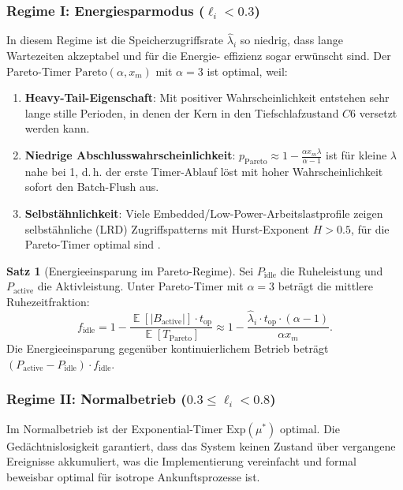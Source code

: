﻿\documentclass[a4paper,12pt]{scrreprt}
\theoremstyle{definition}
\newtheorem{satz}{Satz}[section]
\DeclareMathOperator{\E}{\mathbb{E}}
\newcommand{\Exp}{\mathrm{Exp}}
\newcommand{\Pareto}{\mathrm{Pareto}}
\begin{document}
	\subsubsection{Regime I: Energiesparmodus ($\ell_i < 0.3$)}
	
	In diesem Regime ist die Speicherzugriffsrate $\hat\lambda_i$ so
	niedrig, dass lange Wartezeiten akzeptabel und für die Energie-
	effizienz sogar erwünscht sind. Der Pareto-Timer
	$\Pareto(\alpha, x_m)$ mit $\alpha = 3$ ist optimal, weil:
	
	\begin{enumerate}[noitemsep]
		\item \textbf{Heavy-Tail-Eigenschaft}: Mit positiver Wahrscheinlichkeit
		entstehen sehr lange stille Perioden, in denen der Kern in den
		Tiefschlafzustand $C6$ versetzt werden kann.
		\item \textbf{Niedrige Abschlusswahrscheinlichkeit}: $p_{\Pareto} \approx 1 -
		\frac{\alpha x_m \lambda}{\alpha-1}$ ist für kleine $\lambda$
		nahe bei 1, d.\,h. der erste Timer-Ablauf löst mit hoher
		Wahrscheinlichkeit sofort den Batch-Flush aus.
		\item \textbf{Selbstähnlichkeit}: Viele Embedded/Low-Power-Arbeitslastprofile
		zeigen selbstähnliche (LRD) Zugriffspatterns mit Hurst-Exponent
		$H > 0.5$, für die Pareto-Timer optimal sind \cite{epp2026archiv}.
	\end{enumerate}
	
	\begin{satz}[Energieeinsparung im Pareto-Regime]
		\label{satz:energy_pareto}
		Sei $P_{\mathrm{idle}}$ die Ruheleistung und $P_{\mathrm{active}}$ die
		Aktivleistung. Unter Pareto-Timer mit $\alpha = 3$ beträgt die
		mittlere Ruhezeitfraktion:
		\[
		f_{\mathrm{idle}} = 1 - \frac{\E[|B_{\mathrm{active}}|] \cdot t_{\mathrm{op}}}
		{\E[T_{\Pareto}]}
		\approx 1 - \frac{\hat\lambda_i \cdot t_{\mathrm{op}} \cdot (\alpha-1)}{\alpha x_m}.
		\]
		Die Energieeinsparung gegenüber kontinuierlichem Betrieb beträgt
		$(P_{\mathrm{active}} - P_{\mathrm{idle}}) \cdot f_{\mathrm{idle}}$.
	\end{satz}
	
	\subsubsection{Regime II: Normalbetrieb ($0.3 \le \ell_i < 0.8$)}
	
	Im Normalbetrieb ist der Exponential-Timer $\Exp(\mu^*)$ optimal.
	Die Gedächtnislosigkeit garantiert, dass das System keinen Zustand
	über vergangene Ereignisse akkumuliert, was die Implementierung
	vereinfacht und formal beweisbar optimal für isotrope Ankunftsprozesse
	ist.
	
\end{document}
